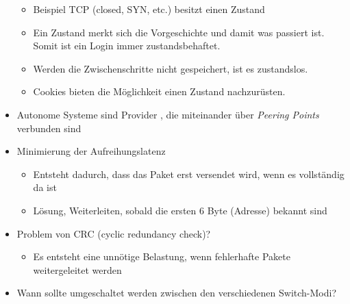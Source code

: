 \documentclass{article} %
\begin{document}
\begin{itemize}
			\begin{itemize}
				\item Beispiel TCP (closed, SYN, etc.) besitzt einen Zustand
				\item Ein Zustand merkt sich die \glqq Vorgeschichte \grqq und damit was passiert ist. Somit ist ein Login immer zustandsbehaftet.
				\item Werden die Zwischenschritte nicht gespeichert, ist es zustandslos.
				\item Cookies bieten die Möglichkeit einen Zustand nachzurüsten.
			\end{itemize}
		\item Autonome Systeme sind \glqq Provider \grqq, die miteinander über \textit{Peering Points} verbunden sind
		\item Minimierung der Aufreihungslatenz
			\begin{itemize}
				\item Entsteht dadurch, dass das Paket erst versendet wird, wenn es vollständig da ist
				\item Lösung, Weiterleiten, sobald die ersten 6 Byte (Adresse) bekannt sind
			\end{itemize}
		\item Problem von CRC (cyclic redundancy check)?
			\begin{itemize}
				\item Es entsteht eine unnötige Belastung, wenn fehlerhafte Pakete weitergeleitet werden
			\end{itemize}
		\item Wann sollte umgeschaltet werden zwischen den verschiedenen Switch-Modi?
	\end{itemize}
\end{document}
